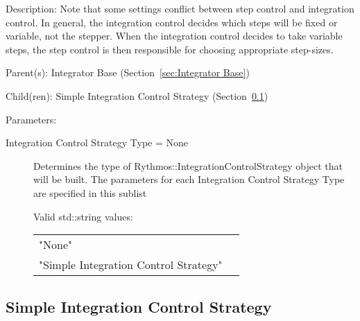\begin{list}{}
  {\setlength{\leftmargin}{1.0in}
   \setlength{\labelwidth}{0.75in}
   \setlength{\labelsep}{0.125in}}
  \item[Description:]
    Note that some settings conflict between step control and integration control.
    In general, the integration control decides which steps will be fixed or variable,
    not the stepper.  When the integration control decides to take variable steps, the
    step control is then responsible for choosing appropriate step-sizes.
  \item[Parent(s):]
    Integrator Base (Section~\ref{sec:Integrator Base})
  \item[Child(ren):]
    Simple Integration Control Strategy (Section~\ref{sec:Simple Integration Control Strategy})
  \item[Parameters:]
    \begin{description}
      \item[Integration Control Strategy Type = None] 
Determines the type of Rythmos::IntegrationControlStrategy object that will be built.
The parameters for each Integration Control Strategy Type are specified in this sublist

  Valid std::string values:

      \begin{tabular}{lp{}}
      "None" & \\ 
      "Simple Integration Control Strategy" & \\ 
      \end{tabular}
\end{description}

\end{list}

\subsection{Simple Integration Control Strategy}
\label{sec:Simple Integration Control Strategy}

